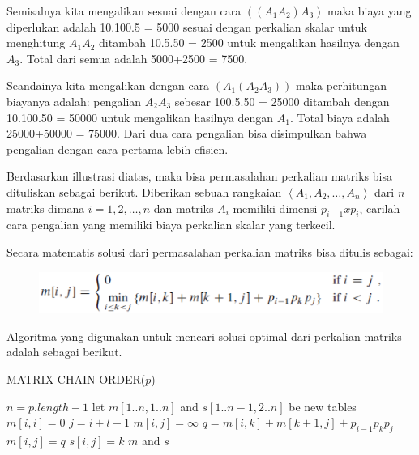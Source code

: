 Semisalnya kita mengalikan sesuai dengan cara $((A_{1}A_{2})A_{3})$ maka biaya yang diperlukan adalah 10.100.5 = 5000 sesuai dengan perkalian skalar untuk menghitung $A_{1}A_{2}$ ditambah 10.5.50 = 2500 untuk mengalikan hasilnya dengan $A_{3}$. Total dari semua adalah 5000+2500 = 7500.

Seandainya kita mengalikan dengan cara $(A_{1}(A_{2}A_{3}))$ maka perhitungan biayanya adalah: pengalian $A_{2}A_{3}$ sebesar 100.5.50 = 25000 ditambah dengan 10.100.50 = 50000 untuk mengalikan hasilnya dengan $A_{1}$. Total biaya adalah 25000+50000 = 75000. Dari dua cara pengalian bisa disimpulkan bahwa pengalian dengan cara pertama lebih efisien.

Berdasarkan illustrasi diatas, maka bisa permasalahan perkalian matriks bisa dituliskan sebagai berikut. Diberikan sebuah rangkaian $\left\langle A_{1},A_{2},\ldots,A_{n} \right\rangle$ dari $n$ matriks dimana $i=1,2,\ldots,n$ dan matriks $A_{i}$ memiliki dimensi $p_{i-1}xp_{i}$, carilah cara pengalian yang memiliki biaya perkalian skalar yang terkecil.

Secara matematis solusi dari permasalahan perkalian matriks bisa ditulis sebagai:

\begin{figure}[H]%
	\includegraphics[scale=0.4]{fig/math-matrix.eps}%
	\label{fig:math-matrix}%
\end{figure}

Algoritma yang digunakan untuk mencari solusi optimal dari perkalian matriks adalah sebagai berikut.

\begin{algorithm}[H]
	\caption{MATRIX-CHAIN-ORDER($p$)}
	\label{algo:matrixChainOrder}
	\begin{algorithmic}[1]
		\STATE $n=p.length-1$
		\STATE let $m[1..n,1..n]$ and $s[1..n-1,2..n]$ be new tables
			\STATE $m[i,i] = 0$
		\ENDFOR
				\STATE $j=i+l-1$
				\STATE $m[i,j]=\infty$
					\STATE $q=m[i,k]+m[k+1,j]+p_{i-1}p_{k}p_{j}$
						\STATE $m[i,j]=q$
						\STATE $s[i,j]=k$
					\ENDIF			
				\ENDFOR
			\ENDFOR
		\ENDFOR
		\RETURN $m$ and $s$
	\end{algorithmic}
\end{algorithm}

